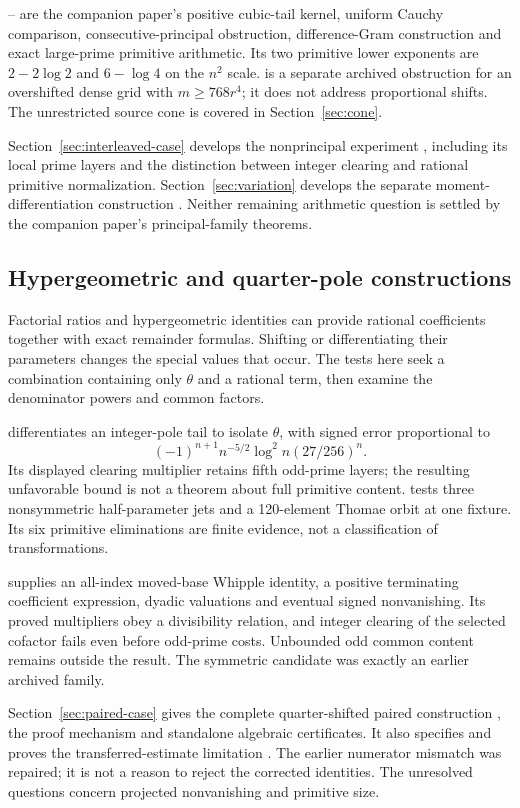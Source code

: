 -- are the companion paper's positive cubic-tail kernel, uniform
Cauchy comparison, consecutive-principal obstruction, difference-Gram
construction and exact large-prime primitive arithmetic. Its two
primitive lower exponents are $2-2\log2$ and $6-\log4$ on the $n^2$
scale.  is a separate archived obstruction for an overshifted dense
grid with $m\geq768r^4$; it does not address proportional shifts.
The unrestricted source cone is covered in Section~\ref{sec:cone}.

Section~\ref{sec:interleaved-case} develops the nonprincipal experiment
, including its local prime layers and the distinction
between integer clearing and rational primitive normalization.
Section~\ref{sec:variation} develops the separate moment-differentiation
construction . Neither remaining arithmetic question is
settled by the companion paper's principal-family theorems.

\subsection{Hypergeometric and quarter-pole constructions}
Factorial ratios and hypergeometric identities can provide rational
coefficients together with exact remainder formulas. Shifting or
differentiating their parameters changes the special values that occur.
The tests here seek a combination containing only $\theta$ and a
rational term, then examine the denominator powers and common factors.

 differentiates an integer-pole tail to isolate $\theta$, with
signed error proportional to
\[
 (-1)^{n+1}n^{-5/2}\log^2n(27/256)^n.
\]
Its displayed clearing multiplier retains fifth odd-prime layers;
the resulting unfavorable bound is not a theorem about full primitive
content.  tests three nonsymmetric half-parameter jets and a
120-element Thomae orbit at one fixture. Its six primitive eliminations
are finite evidence, not a classification of transformations.

 supplies an all-index moved-base Whipple identity, a positive
terminating coefficient expression, dyadic valuations and eventual
signed nonvanishing. Its proved multipliers obey a divisibility relation,
and integer clearing of the selected cofactor fails even before
odd-prime costs. Unbounded odd common content remains outside the result.
The symmetric candidate was exactly an earlier archived family.

Section~\ref{sec:paired-case} gives the complete quarter-shifted paired
construction , the proof mechanism and standalone algebraic
certificates. It also specifies and proves the transferred-estimate
limitation . The earlier numerator mismatch was repaired;
it is not a reason to reject the corrected identities. The unresolved
questions concern projected nonvanishing and primitive size.

